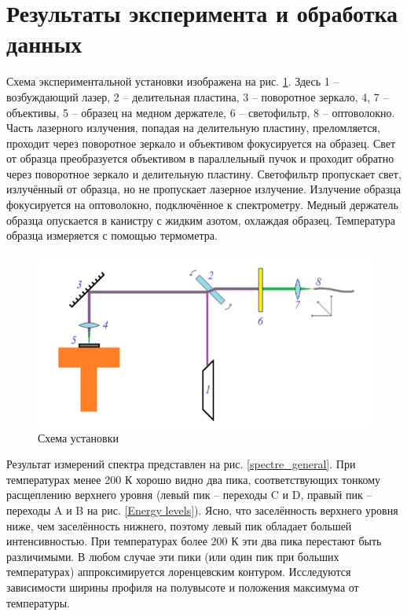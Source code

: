 \section{Результаты эксперимента и обработка данных}

Схема экспериментальной установки изображена на рис. \ref{experimental_scheme}.
Здесь 1 -- возбуждающий лазер, 2 -- делительная пластина, 3 -- поворотное зеркало,
4, 7 -- объективы, 5 -- образец на медном держателе, 6 -- светофильтр, 8 -- оптоволокно.
Часть лазерного излучения, попадая на делительную пластину, преломляется, проходит
через поворотное зеркало и объективом фокусируется на образец. Свет от образца 
преобразуется объективом в параллельный пучок и проходит обратно через поворотное
зеркало и делительную пластину. Светофильтр пропускает свет, излучённый от образца,
но не пропускает лазерное излучение. Излучение образца фокусируется на оптоволокно,
подключённое к спектрометру. Медный держатель образца опускается в канистру с 
жидким азотом, охлаждая образец. Температура образца измеряется с помощью
термометра. 

\begin{figure}[!h]
    \begin{center}
        \includegraphics[width=0.7 \linewidth]{experimental_scheme.png}
        \caption{Схема установки}
        \label{experimental_scheme}
    \end{center}
\end{figure}


Результат измерений спектра представлен на рис. \ref{spectre_general}. 
При температурах менее 200 К хорошо видно два пика, соответствующих тонкому 
расщеплению верхнего уровня (левый пик -- переходы C и D, правый пик -- переходы
A и B на рис. \ref{Energy levels}). Ясно, что заселённость верхнего уровня
ниже, чем заселённость нижнего, поэтому левый пик обладает большей интенсивностью.
При температурах более 200 К эти два пика перестают быть различимыми. В любом случае
эти пики (или один пик при больших температурах) аппроксимируется лоренцевским
контуром. Исследуются зависимости ширины профиля на полувысоте и положения максимума
от температуры.  

